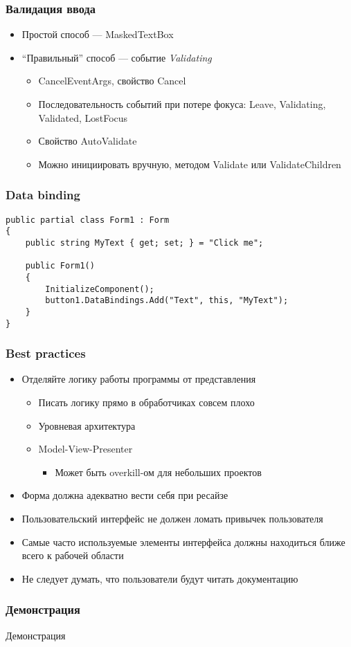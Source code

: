 \documentclass[xetex,mathserif,serif]{beamer}
\begin{document}
    \begin{frame}
        \frametitle{Валидация ввода}
        \begin{itemize}
            \item Простой способ --- MaskedTextBox
            \item ``Правильный'' способ --- событие \textit{Validating}
            \begin{itemize}
                \item CancelEventArgs, свойство Cancel
                \item Последовательность событий при потере фокуса: Leave, Validating, Validated, LostFocus
                \item Свойство AutoValidate
                \item Можно инициировать вручную, методом Validate или ValidateChildren
            \end{itemize}
        \end{itemize}
    \end{frame}

    \begin{frame}[fragile]
        \frametitle{Data binding}
        \begin{verbatim}
public partial class Form1 : Form
{
    public string MyText { get; set; } = "Click me";

    public Form1()
    {
        InitializeComponent();
        button1.DataBindings.Add("Text", this, "MyText");
    }
}
        \end{verbatim}
    \end{frame}

    \begin{frame}
        \frametitle{Best practices}
        \begin{itemize}
            \item Отделяйте логику работы программы от представления
            \begin{itemize}
                \item Писать логику прямо в обработчиках совсем плохо
                \item Уровневая архитектура
                \item Model-View-Presenter
                \begin{itemize}
                    \item Может быть overkill-ом для небольших проектов
                \end{itemize}
            \end{itemize}
            \item Форма должна адекватно вести себя при ресайзе
            \item Пользовательский интерфейс не должен ломать привычек пользователя
            \item Самые часто используемые элементы интерфейса должны находиться ближе всего к рабочей области
            \item Не следует думать, что пользователи будут читать документацию
        \end{itemize}
    \end{frame}

    \begin{frame}
        \frametitle{Демонстрация}
        \begin{Huge}\begin{center}Демонстрация\end{center}\end{Huge}
    \end{frame}
\end{document}
